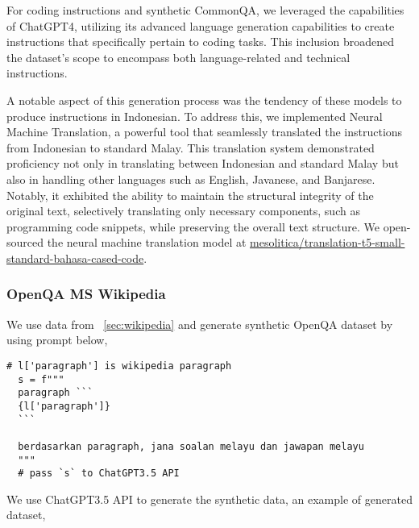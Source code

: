 \documentclass{article}
\begin{document}
For coding instructions and synthetic CommonQA, we leveraged the capabilities of ChatGPT4, utilizing its advanced language generation capabilities to create instructions that specifically pertain to coding tasks. This inclusion broadened the dataset's scope to encompass both language-related and technical instructions.

A notable aspect of this generation process was the tendency of these models to produce instructions in Indonesian. To address this, we implemented Neural Machine Translation, a powerful tool that seamlessly translated the instructions from Indonesian to standard Malay. This translation system demonstrated proficiency not only in translating between Indonesian and standard Malay but also in handling other languages such as English, Javanese, and Banjarese. Notably, it exhibited the ability to maintain the structural integrity of the original text, selectively translating only necessary components, such as programming code snippets, while preserving the overall text structure. We open-sourced the neural machine translation model at \href{https://huggingface.co/mesolitica/translation-t5-small-standard-bahasa-cased-code}{mesolitica/translation-t5-small-standard-bahasa-cased-code}.

\subsubsection{OpenQA MS Wikipedia}

We use data from ~\ref{sec:wikipedia} and generate synthetic OpenQA dataset by using prompt below,

\begin{lstlisting}[]
  # l['paragraph'] is wikipedia paragraph
  s = f"""
  paragraph ```
  {l['paragraph']}
  ```
  
  berdasarkan paragraph, jana soalan melayu dan jawapan melayu
  """
  # pass `s` to ChatGPT3.5 API
\end{lstlisting}

We use ChatGPT3.5 API to generate the synthetic data, an example of generated dataset,
\end{document}
